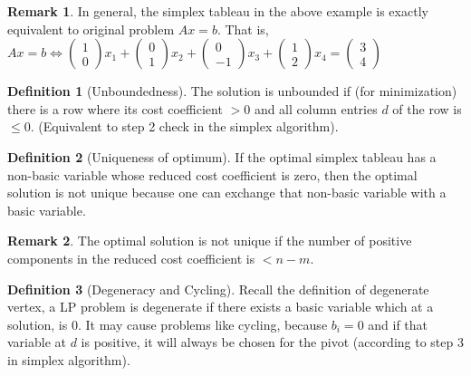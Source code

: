 \documentclass{article}
\theoremstyle{definition}
\newtheorem{definition}{Definition}[section]
\newtheorem*{remark}{Remark}
\begin{document}
	\begin{remark}
		In general, the simplex tableau in the above example is exactly equivalent to original problem $Ax = b$. That is, $Ax = b \Leftrightarrow \begin{pmatrix}1 \\ 0 \end{pmatrix} x_1 + \begin{pmatrix}0 \\ 1 \end{pmatrix} x_2 + \begin{pmatrix}0 \\ -1 \end{pmatrix} x_3 + \begin{pmatrix}1 \\ 2 \end{pmatrix} x_4 = \begin{pmatrix}3 \\ 4 \end{pmatrix}$
	\end{remark}

	\begin{definition}[Unboundedness]\hfill\break
		The solution is unbounded if (for minimization) there is a row where its cost coefficient $>0$ and all column entries $d$ of the row is $\leq 0$. (Equivalent to step 2 check in the simplex algorithm).
	\end{definition}

	\begin{definition}[Uniqueness of optimum]\hfill\break
		If the optimal simplex tableau has a non-basic variable whose reduced cost coefficient is zero, then the optimal solution is not unique because one can exchange that non-basic variable with a basic variable.
	\end{definition}

	\begin{remark}
		The optimal solution is not unique if the number of positive components in the reduced cost coefficient is $< n-m$.
	\end{remark}

	\begin{definition}[Degeneracy and Cycling]\hfill\break
		Recall the definition of degenerate vertex, a LP problem is degenerate if there exists a basic variable which at a solution, is 0. It may cause problems like cycling, because $b_i = 0$ and if that variable at $d$ is positive, it will always be chosen for the pivot (according to step 3 in simplex algorithm).
	\end{definition}
\end{document}
